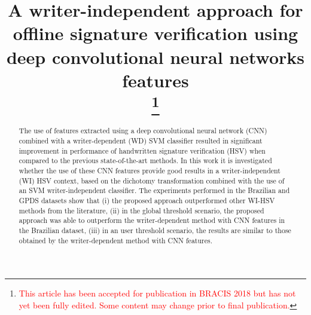 \documentclass[conference]{IEEEtran}
\begin{document}
\title{A writer-independent approach for offline signature verification using deep convolutional neural networks features\\
\thanks{\textcolor{red}{ This article has been accepted for publication in BRACIS 2018 but has not yet been fully edited. Some content may change prior to final publication.}}
}

\author{
\and
{}
\and
{}



}

\maketitle

\begin{abstract}
The use of features extracted using a deep convolutional neural network (CNN) combined with a writer-dependent (WD) SVM classifier resulted in significant improvement in performance of handwritten signature verification (HSV) when compared to the previous state-of-the-art methods. In this work it is investigated whether the use of these CNN features provide good results in a writer-independent (WI) HSV context, based on the dichotomy transformation combined with the use of an SVM writer-independent classifier. The experiments performed in the Brazilian and GPDS datasets show that (i) the proposed approach outperformed other WI-HSV methods from the literature, (ii) in the global threshold scenario, the proposed approach was able to outperform the writer-dependent method with CNN features in  the Brazilian dataset, (iii) in an user threshold scenario, the results are similar to those obtained by the writer-dependent method with CNN features.
\end{abstract}
\end{document}
